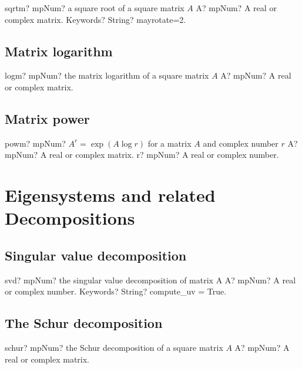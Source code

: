 \documentclass[12pt,a4paper,openany]{book}
\begin{document}
\begin{mpFunctionsExtract}
\mpFunctionTwo
{sqrtm? mpNum? a square root of a square matrix $A$}
{A? mpNum? A real or complex matrix.}
{Keywords? String?  mayrotate=2.}
\end{mpFunctionsExtract}

\section{Matrix logarithm}

\begin{mpFunctionsExtract}
\mpFunctionOne
{logm? mpNum? the matrix logarithm of a square matrix $A$}
{A? mpNum? A real or complex matrix.}
\end{mpFunctionsExtract}

\section{Matrix power}

\begin{mpFunctionsExtract}
\mpFunctionTwo
{powm? mpNum? $A^r=\exp(A \log r)$ for a matrix $A$ and complex number $r$}
{A? mpNum? A real or complex matrix.}
{r? mpNum? A real or complex number.}
\end{mpFunctionsExtract}

\chapter{Eigensystems and related Decompositions}

\section{Singular value decomposition}

\begin{mpFunctionsExtract}
\mpFunctionTwo
{svd? mpNum? the singular value decomposition of matrix A}
{A? mpNum? A real or complex number.}
{Keywords? String? compute\_uv = True.}
\end{mpFunctionsExtract}

\section{The Schur decomposition}

\begin{mpFunctionsExtract}
\mpFunctionOne
{schur? mpNum? the Schur decomposition of a square matrix $A$}
{A? mpNum? A real or complex matrix.}
\end{mpFunctionsExtract}
\end{document}
